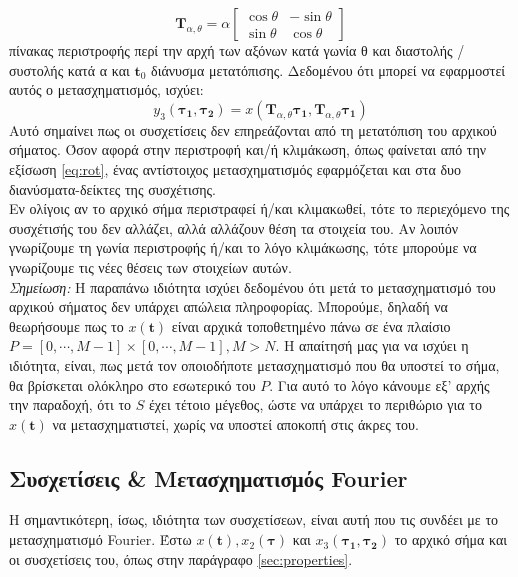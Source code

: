 \begin{equation}
\textbf{T}_{\alpha,\theta} = \alpha 
\begin{bmatrix} \cos\theta & -\sin\theta \\ \sin\theta & \cos\theta \end{bmatrix}
\end{equation}
πίνακας περιστροφής περί την αρχή των αξόνων κατά γωνία θ και διαστολής / συστολής κατά α και $\textbf{t}_0$ διάνυσμα μετατόπισης. Δεδομένου ότι μπορεί να εφαρμοστεί αυτός ο μετασχηματισμός, ισχύει:
\begin{equation}\label{eq:rot}
y_3(\boldsymbol{\tau_1},\boldsymbol{\tau_2}) = x(\textbf{T}_{\alpha,\theta}\boldsymbol{\tau_1},\textbf{T}_{\alpha,\theta}\boldsymbol{\tau_1})
\end{equation}
Αυτό σημαίνει πως οι συσχετίσεις δεν επηρεάζονται από τη μετατόπιση του αρχικού σήματος. Όσον αφορά στην περιστροφή και/ή κλιμάκωση, όπως φαίνεται από την εξίσωση \ref{eq:rot}, ένας αντίστοιχος μετασχηματισμός εφαρμόζεται και στα δυο διανύσματα-δείκτες της συσχέτισης.\\
Εν ολίγοις αν το αρχικό σήμα περιστραφεί ή/και κλιμακωθεί, τότε το περιεχόμενο της συσχέτισής του δεν αλλάζει, αλλά αλλάζουν θέση τα στοιχεία του. Αν λοιπόν γνωρίζουμε τη γωνία περιστροφής ή/και το λόγο κλιμάκωσης, τότε μπορούμε να γνωρίζουμε τις νέες θέσεις των στοιχείων αυτών.\\
\textit{Σημείωση: }Η παραπάνω ιδιότητα ισχύει δεδομένου ότι μετά το μετασχηματισμό του αρχικού σήματος δεν υπάρχει απώλεια πληροφορίας. Μπορούμε, δηλαδή να θεωρήσουμε πως το $x(\textbf{t})$ είναι αρχικά τοποθετημένο πάνω σε ένα πλαίσιο $P = [0, \cdots ,M-1]\times[0, \cdots ,M-1], M>N$. Η απαίτησή μας για να ισχύει η ιδιότητα, είναι, πως μετά τον οποιοδήποτε μετασχηματισμό που θα υποστεί το σήμα, θα βρίσκεται ολόκληρο στο εσωτερικό του $P$. Για αυτό το λόγο κάνουμε εξ' αρχής την παραδοχή, ότι το $S$ έχει τέτοιο μέγεθος, ώστε να υπάρχει το περιθώριο για το $x(\textbf{t})$ να μετασχηματιστεί, χωρίς να υποστεί αποκοπή στις άκρες του.



\subsection{Συσχετίσεις \& Μετασχηματισμός Fourier}
Η σημαντικότερη, ίσως, ιδιότητα των συσχετίσεων, είναι αυτή που τις συνδέει με το μετασχηματισμό Fourier. Έστω $x(\textbf{t}), x_2(\boldsymbol{\tau})$ και $x_3(\boldsymbol{\tau_1},\boldsymbol{\tau_2})$ το αρχικό σήμα και οι συσχετίσεις του, όπως στην παράγραφο \ref{sec:properties}.
